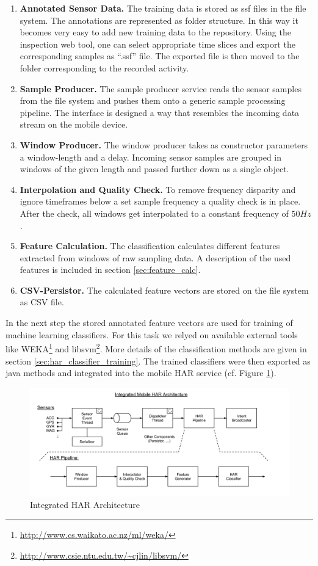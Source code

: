 \begin{enumerate}
  \item {\bf Annotated Sensor Data.} The training data is stored as
    ssf files in the file system. The annotations are represented as
    folder structure. In this way it becomes very easy to add new
    training data to the repository. Using the inspection web tool,
    one can select appropriate time slices and export the
    corresponding samples as ``.ssf'' file. The exported file is then
    moved to the folder corresponding to the recorded activity.
  \item {\bf Sample Producer.} The sample producer service reads the 
    sensor samples from the file system and pushes them onto a generic 
    sample processing pipeline. The interface is designed a way that
    resembles the incoming data stream on the mobile device.
  \item {\bf Window Producer.} The window producer takes as
    constructor parameters a window-length and a delay. Incoming
    sensor samples are grouped in windows of the given length and
    passed further down as a single object.
  \item {\bf Interpolation and Quality Check.}  To remove frequency
    disparity and ignore timeframes below a set sample frequency a
    quality check is in place. After the check, all windows get
    interpolated to a constant frequency of $50Hz$.
  \item {\bf Feature Calculation.} The classification calculates
    different features extracted from windows of raw sampling data. A
    description of the used features is included in section
    \ref{sec:feature_calc}.
  \item {\bf CSV-Persistor.} The calculated feature vectors are stored
    on the file system as CSV file. 
\end{enumerate}

In the next step the stored annotated feature vectors are used for
training of machine learning classifiers. For this task we relyed on 
available external tools like
WEKA\footnote{\url{http://www.cs.waikato.ac.nz/ml/weka/}}
and libsvm\footnote{\url{http://www.csie.ntu.edu.tw/~cjlin/libsvm/}}.
More details of the classification methods are given in section
\ref{sec:har_classifier_training}.
The trained classifiers were then exported as java methods and
integrated into the mobile HAR service (cf. Figure \ref{fig:integrated_har}).

\begin{figure}[htbp]
\centering
\includegraphics[width=\textwidth]{img/har/integration.png}
\caption{Integrated HAR Architecture}\label{fig:integrated_har}
\end{figure}

